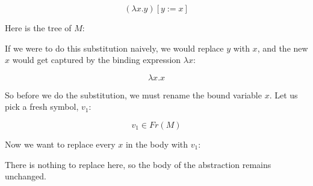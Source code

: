 \documentclass{book}
\numberwithin{equation}{chapter}
\begin{document}
\begin{equation}
(\lambda x.y)[y := x]
\end{equation}

\noindent
Here is the tree of $M$:

\begin{center}
\end{center}

\noindent
If we were to do this substitution naively, we would replace $y$ with $x$, and the new $x$ would get captured by the binding expression $\lambda x$:

\begin{equation}
\lambda x.x
\end{equation}

\noindent
So before we do the substitution, we must rename the bound variable $x$. Let us pick a fresh symbol, $v_{1}$:

\begin{equation}
v_{1} \in Fr(M)
\end{equation}

\noindent
Now we want to replace every $x$ in the body with $v_{1}$:

\begin{center}
\end{center}

\noindent
There is nothing to replace here, so the body of the abstraction remains unchanged.

\begin{center}
\end{center}
\end{document}
